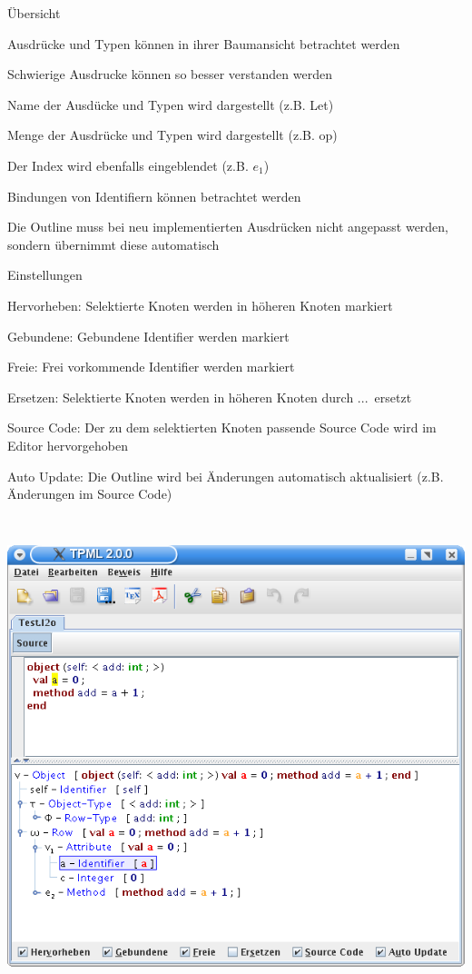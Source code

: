 {
  \begin{itemgroup}{Übersicht}
    \item Ausdrücke und Typen können in ihrer Baumansicht betrachtet werden
    \item Schwierige Ausdrucke können so besser verstanden werden
    \item Name der Ausdücke und Typen wird dargestellt (z.B. Let)
    \item Menge der Ausdrücke und Typen wird dargestellt (z.B. op)
    \item Der Index wird ebenfalls eingeblendet (z.B. $e_1$)
    \item Bindungen von Identifiern können betrachtet werden
    \item Die Outline muss bei neu implementierten Ausdrücken nicht angepasst
          werden, sondern übernimmt diese automatisch
  \end{itemgroup}
}

{
  \begin{itemgroup}{Einstellungen}
    \item \glqq Hervorheben\grqq: Selektierte Knoten werden in höheren Knoten markiert
    \item \glqq Gebundene\grqq: Gebundene Identifier werden markiert
    \item \glqq Freie\grqq: Frei vorkommende Identifier werden markiert
    \item \glqq Ersetzen\grqq: Selektierte Knoten werden in höheren Knoten durch
                               \glqq ...\grqq\ ersetzt
    \item \glqq Source Code\grqq: Der zu dem selektierten Knoten passende Source Code
                                  wird im Editor hervorgehoben
    \item \glqq Auto Update\grqq: Die Outline wird bei Änderungen automatisch aktualisiert
                                  (z.B. Änderungen im Source Code)
  \end{itemgroup}
}

{
  \begin{center}
    \includegraphics[height=14cm]{images/outline.png}
  \end{center}
}